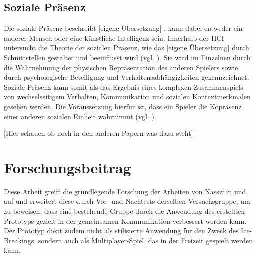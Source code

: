 \subsection{Soziale Präsenz}
Die soziale Präsenz beschreibt  [eigene Übersetzung] \cite[S. 1]{biocca_towards_2003}.  kann dabei entweder ein anderer Mensch oder eine künstliche Intelligenz sein. Innerhalb der \ac{HCI} untersucht die Theorie der sozialen Präsenz, wie das  [eigene Übersetzung] \cite[S. 1]{biocca_towards_2003} durch Schnittstellen gestaltet und beeinflusst wird (vgl. \cite[S. 1]{biocca_towards_2003}). Sie wird im Einzelnen durch die Wahrnehmung der physischen Repräsentation des anderen Spielers sowie durch psychologische Beteiligung und Verhaltensabhängigkeiten gekennzeichnet. Soziale Präsenz kann somit als das Ergebnis eines komplexen Zusammenspiels von wechselseitigem Verhalten, Kommunikation und sozialen Kontextmerkmalen gesehen werden. Die Voraussetzung hierfür ist, dass ein Spieler die Kopräsenz einer anderen sozialen Einheit wahrnimmt (vgl. \cite[S. 1]{emmerich_game_2016}).

[Hier schauen ob noch in den anderen Papern was dazu steht]




\section{Forschungsbeitrag}


Diese Arbeit greift die grundlegende Forschung der Arbeiten von Nassir in \cite{nasir_cooperative_2013} und \cite{nasir_effect_2015} auf und erweitert diese durch Vor- und Nachtests derselben Versuchsgruppe, um zu beweisen, dass eine bestehende Gruppe durch die Anwendung des erstellten Prototyps gezielt in der gemeinsamen Kommunikation verbessert werden kann. Der Prototyp dient zudem nicht als stilisierte Anwendung für den Zweck des Ice-Breakings, sondern auch als Multiplayer-Spiel, das in der Freizeit gespielt werden kann.

